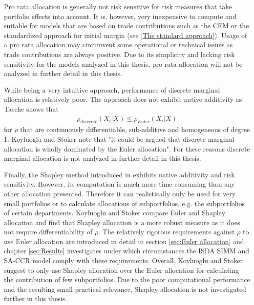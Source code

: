 \documentclass[../Thesis_AHoecherl.tex]{subfiles}
\begin{document}
Pro rata allocation is generally not risk sensitive for risk measures that take portfolio effects into account.
It is, however, very inexpensive to compute and suitable for models that are based on trade contributions such as the \gls{CEM} or the standardized approach for initial margin (see \ref{The standard approach}).
Usage of a pro rata allocation may circumvent some operational or technical issues as trade contributions are always positive.
Due to its simplicity and lacking risk sensitivity for the models analyzed in this thesis, pro rata allocation will not be analyzed in further detail in this thesis.

While being a very intuitive approach, performance of discrete marginal allocation is relatively poor. The approach does not exhibit native additivity as Tasche \cite{tasche2007} shows that 
\begin{align*}
    \rho_{discrete}\left(X_i|X\right) \leq \rho_{Euler}\left(X_i|X\right)
\end{align*}
for $\rho$ that are continuously differentiable, sub-additive and homogeneous of degree 1. 
Koyluoglu and Stoker \cite{koyluoglu2002risk} note that "it could be argued that discrete marginal allocation is wholly dominated by the Euler allocation". For these reasons discrete marginal allocation is not analyzed in further detail in this thesis.

Finally, the Shapley method introduced in \cite{shapley1951} exhibits native additivity and risk sensitivity.
However, its computation is much more time consuming than any other allocation presented. 
Therefore it can realistically only be used for very small portfolios or to calculate allocations of subportfolios, e.g. the subportfolios of certain departments.
Koyluoglu and Stoker \cite{koyluoglu2002risk} compare Euler and Shapley allocation and find that Shapley allocation is a more robust measure as it does not require differentiability of $\rho$. The relatively rigorous requirements against $\rho$ to use Euler allocation are introduced in detail in section \ref{sec:Euler allocation} and chapter \ref{sec:Results} investigates under which circumstances the \gls{ISDA SIMM} and \gls{SA-CCR} model comply with these requirements.
Overall, Koyluoglu and Stoker suggest to only use Shapley allocation over the Euler allocation for calculating the contribution of few subportfolios.
Due to the poor computational performance and the resulting small practical relevance, Shapley allocation is not investigated further in this thesis.
\end{document}
